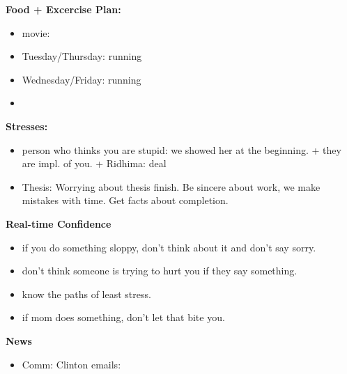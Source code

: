 \documentclass[serif, mathserif, final]{beamer}
\begin{document}
{  \textbf{Food + Excercise Plan:}\\
  \begin{itemize} 
  \item \tiny movie: 
    \tiny \item \tiny Tuesday/Thursday: running 
  \item \tiny Wednesday/Friday: running 
  \item \tiny 
  \end{itemize}
            \textbf{Stresses:}\\
            \begin{itemize} 
            \item \tiny person who thinks you are stupid:  we
              showed her at the beginning.  + they are impl. of you. +
               Ridhima: deal 
            \item \tiny Thesis:  Worrying about thesis finish. Be
              sincere about work, we make mistakes with time. Get
              facts about completion.
            \end{itemize}
            
            \textbf{Real-time Confidence}\\
            \begin{itemize}
              \tiny \item \tiny if you do something sloppy, don't
              think about it and don't say sorry.
            \item \tiny don't think someone is trying to hurt you if
              they say something.
            \item \tiny know the paths of least stress.
            \item \tiny if mom does something, don't let that bite
              you. 
            \end{itemize} 
            \textbf{News} 
            \begin{itemize}
            \item \tiny Comm: Clinton emails: 
            \end{itemize} 
    
}
\end{document}
